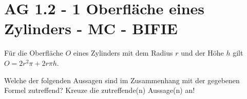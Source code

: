 \section{AG 1.2 - 1 Oberfläche eines Zylinders - MC - BIFIE}

\begin{beispiel}[AG 1.2]{1} %
				Für die Oberfläche $O$ eines Zylinders mit dem Radius $r$ und der Höhe $h$ gilt $O=2r^2\pi+2r\pi h$.
				
				Welche der folgenden Aussagen sind im Zusammenhang mit der gegebenen Formel zutreffend? Kreuze die zutreffende(n) Aussage(n) an!
\end{beispiel}